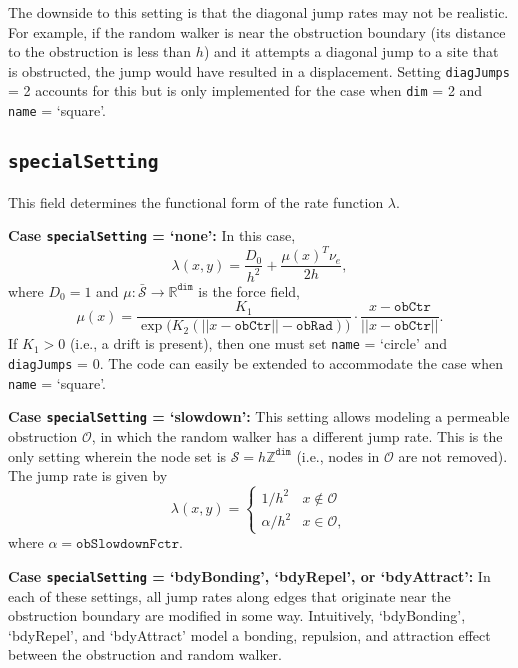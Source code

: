 \documentclass[11pt, oneside]{article}   	%
\theoremstyle{definition}
\newcommand{\real}{{\mathbb R}}
\newcommand\sS{\mathcal{S}}
\newcommand{\integ}{{\mathbb Z}}
\newcommand\oS{\bar{\sS}}
\begin{document}
The downside to this setting is that the diagonal jump rates may not be realistic. For example, if the random walker is near the obstruction boundary (its distance to the obstruction is less than $h$) and it attempts a diagonal jump to a site that is obstructed, the jump would have resulted in a displacement. Setting \texttt{diagJumps} = 2 accounts for this but is only implemented for the case when \texttt{dim} = 2 and \texttt{name} = `square'.

\subsection{\texttt{specialSetting}}
This field determines the functional form of the rate function $\lambda$.

{\bf Case \texttt{specialSetting} = `none':}
In this case,
\begin{equation}\label{eqn:rate-normal}
	\lambda(x,y) = \frac{D_0}{h^2} + \frac{\mu(x)^T \nu_e}{2h},
\end{equation}
where $D_0 = 1$ and $\mu: \oS \rightarrow \real^{\texttt{dim}}$ is the force field,
\begin{equation}\label{eqn:drift}
\mu(x) = \frac{K_1}{\exp\big(K_2(||x - \texttt{obCtr}|| - \texttt{obRad})\big)} \cdot \frac{x - \texttt{obCtr}}{||x - \texttt{obCtr}||}.
\end{equation}
If $K_1 > 0$ (i.e., a drift is present), then one must set \texttt{name} = `circle' and \texttt{diagJumps} = 0. The code can easily be extended to accommodate the case when \texttt{name} = `square'.

{\bf Case \texttt{specialSetting} = `slowdown':}
This setting allows modeling a permeable obstruction $\mathcal{O}$, in which the random walker has a different jump rate. This is the only setting wherein the node set is $\sS = h \integ^{\texttt{dim}}$ (i.e., nodes in $\mathcal{O}$ are not removed). The jump rate is given by
\begin{equation}\label{eqn:rate-slowdown}
\lambda(x,y) = 
	\begin{cases}
		1/h^2 & x \notin \mathcal{O} \\
		\alpha/h^2 & x \in \mathcal{O},
	\end{cases}
\end{equation}
where $\alpha = \texttt{obSlowdownFctr}$.

{\bf Case \texttt{specialSetting} = `bdyBonding', `bdyRepel', or `bdyAttract':} In each of these settings, all jump rates along edges that originate near the obstruction boundary are modified in some way. Intuitively, `bdyBonding', `bdyRepel', and `bdyAttract' model a bonding, repulsion, and attraction effect between the obstruction and random walker.
\end{document}
